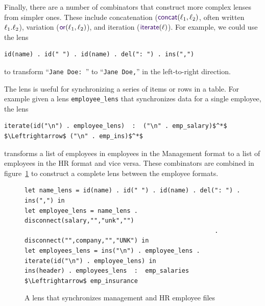 \documentclass[12pt]{article}
\begin{document}
{Finally, there are a number of combinators that construct
more complex lenses from simpler ones. These include concatenation
($\ConcatLensOf{\Lens_1}{\Lens_2}$, often written $\mathit{\ell}_1 . \mathit{\ell}_2$), variation
($\OrLensOf{\Lens_1}{\Lens_2}$), and iteration ($\IterateLensOf{\Lens}$).
For example, we could use the lens
%
\begin{lstlisting}
id(name) . id(" ") . id(name) . del(": ") . ins(",")
\end{lstlisting}
%
to transform ``\lstinline{Jane Doe: }'' to ``\lstinline{Jane Doe,}'' in
the left-to-right direction.

%
%
The \IterateLens lens is useful for synchronizing a series of items or rows in a
table. For example given a
lens \lstinline{employee_lens} that synchronizes data for a single employee, the
lens
%
\begin{lstlisting}
iterate(id("\n") . employee_lens)  :  ("\n" . emp_salary)$^*$ $\Leftrightarrow$ ("\n" . emp_ins)$^*$
\end{lstlisting}
%
transforms a list of employees in employees in the Management format to a list
of employees in the HR format and vice versa. These combinators
are combined in figure~\ref{fig:example_lens} to construct a complete lens
between the employee formats.

\begin{figure}
\begin{lstlisting}
let name_lens = id(name) . id(" ") . id(name) . del(": ") . ins(",") in
let employee_lens = name_lens . disconnect(salary,"","unk","") 
                                                    . disconnect("",company,"","UNK") in
let employees_lens = ins("\n") . employee_lens . iterate(id("\n") . employee_lens) in
ins(header) . employees_lens  :  emp_salaries $\Leftrightarrow$ emp_insurance
\end{lstlisting}
  \caption{A lens that synchronizes management and HR employee files}
  \label{fig:example_lens}
\end{figure}

}
\end{document}
